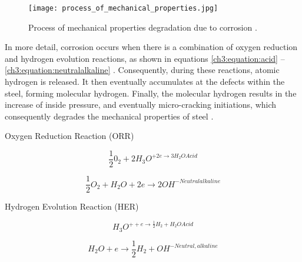 \begin{figure}[H]
    \centering
    \texttt{[image: process\_of\_mechanical\_properties.jpg]}
    \caption{Process of mechanical properties degradation due to corrosion \cite{protopopoff2011surface}.}
    \label{ch3:figure:degradation}
\end{figure}

In more detail, corrosion occurs when there is a combination of oxygen reduction and hydrogen evolution reactions, as shown in equations \ref{ch3:equation:acid} – \ref{ch3:equation:neutralalkaline} \cite{li2018effect}.  Consequently, during these reactions, atomic hydrogen is released. It then eventually accumulates at the defects within the steel, forming molecular hydrogen. Finally, the molecular hydrogen results in the increase of inside pressure, and eventually micro-cracking initiations, which consequently degrades the mechanical properties of steel \cite{whitman1924effect}.

\begin{center}
    Oxygen Reduction Reaction (ORR)
\end{center}

\begin{equation}
    \frac{1}{2}0_2 + 2H_3O^{+2e \rightarrow 3H_2OAcid}
    \label{ch3:equation:acid}
\end{equation}

\begin{equation}
    \frac{1}{2}O_2 + H_2O + 2e \rightarrow 2OH^{-Neutralalkaline}
\end{equation}

\begin{center}
    Hydrogen Evolution Reaction (HER)
\end{center}

\begin{equation}
    H_3O^{++e \rightarrow \frac{1}{2}H_2 + H_2OAcid}
\end{equation}

\begin{equation}
    H_2O + e \rightarrow \frac{1}{2}H_2 + OH^{-Neutral,alkaline}
    \label{ch3:equation:neutralalkaline}
\end{equation}

